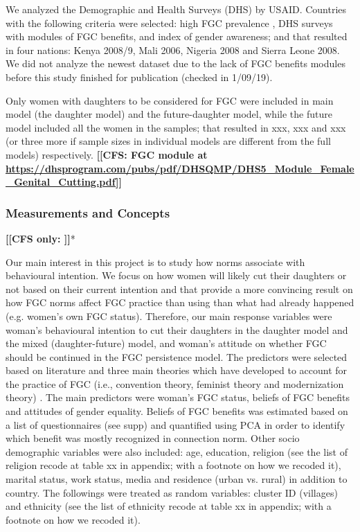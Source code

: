 \documentclass[12pt,]{article}
\newcommand{\comment}[1]{\textbf{[[#1]]}}
\newcommand{\cfcmt}[1]{\comment{CFS: #1}}
\newcommand{\cfonly}[1]{\comment{CFS only: #1}}
\begin{document}
{We analyzed the Demographic and Health Surveys (DHS) by USAID.  Countries with the following criteria were selected:  high FGC prevalence \cite{UNIC16}, DHS surveys with modules of FGC benefits, and index of gender awareness; and that resulted in four nations:  Kenya 2008/9, Mali 2006, Nigeria 2008 and Sierra Leone 2008.  We did not analyze the newest dataset due to the lack of FGC benefits modules before this study finished for publication (checked in 1/09/19).

Only women with daughters to be considered for FGC were included in 
 main model (the daughter model) and the future-daughter model, while the future model included all the women in the samples; that resulted in xxx, xxx and xxx (or three more if sample sizes in individual models are different from the full models) respectively.
\cfcmt{FGC module at \url{https://dhsprogram.com/pubs/pdf/DHSQMP/DHS5_Module_Female_Genital_Cutting.pdf}}

\subsubsection{Measurements and Concepts}\label{measurements-and-concepts}
\cfonly{\cite{Rima08}}*

Our main interest in this project is to study how norms associate with behavioural intention.  We focus on how women will likely cut their daughters or not based on their current intention and that provide a more convincing result on how FGC norms affect FGC practice than using than what had already happened (e.g. women’s own FGC status).  Therefore, our main response variables were woman's behavioural intention to cut their daughters in the daughter model and the mixed (daughter-future) model, and woman's attitude on whether FGC should be continued in the FGC persistence model.  The predictors were selected based on literature and three main theories which have developed to account for the practice of FGC (i.e., convention theory, feminist theory and modernization theory) \cite{Fay05, BellNova15}.  The main predictors were woman's FGC status, beliefs of FGC benefits and attitudes of gender equality.  Beliefs of FGC benefits was estimated based on a list of questionnaires (see supp) and quantified using PCA in order to identify which benefit was mostly recognized in connection norm.  Other socio demographic variables were also included:  age, education, religion (see the list of religion recode at table xx in appendix; with a footnote on how we recoded it), marital status, work status, media and residence (urban vs. rural) in addition to country.  The followings were treated as random variables:  cluster ID (villages) and ethnicity (see the list of ethnicity recode at table xx in appendix; with a footnote on how we recoded it).

}
\end{document}
